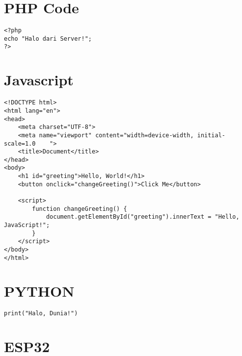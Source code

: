 \section{PHP Code}
\begin{minipage}{0.99\linewidth}
    \begin{lstlisting}[style=PHPStyle,caption={Endpoint PHP Minimalis},label={lst:php-simple}]
<?php
echo "Halo dari Server!";
?>
\end{lstlisting}
\end{minipage}


\section{Javascript}
\begin{minipage}{0.99\linewidth}
    \begin{lstlisting}[style=JavaScriptStyle,caption={Javascript Minimalis},label={lst:js-simple}]
<!DOCTYPE html>
<html lang="en">
<head>
    <meta charset="UTF-8">
    <meta name="viewport" content="width=device-width, initial-scale=1.0    ">
    <title>Document</title>
</head>
<body>
    <h1 id="greeting">Hello, World!</h1>
    <button onclick="changeGreeting()">Click Me</button>

    <script>
        function changeGreeting() {
            document.getElementById("greeting").innerText = "Hello, JavaScript!";
        }
    </script>
</body>
</html>
\end{lstlisting}
\end{minipage}

\section{PYTHON}
\begin{minipage}{0.99\linewidth}
    \begin{lstlisting}[style=PythonStyle,caption={Python Minimalis},label={lst:python-simple}]
        print("Halo, Dunia!")
    \end{lstlisting}
\end{minipage}

\section{ESP32}
\begin{minipage}{0.99\linewidth}

\end{minipage}